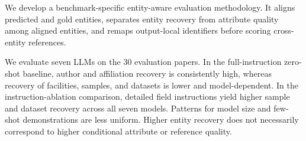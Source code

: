 We develop a benchmark-specific entity-aware evaluation methodology. It 
aligns predicted and gold entities, separates entity recovery from attribute 
quality among aligned entities, and remaps output-local identifiers before 
scoring cross-entity references.

We evaluate seven LLMs on the 30 evaluation papers. In the full-instruction 
zero-shot baseline, author and affiliation recovery is consistently high, 
whereas recovery of facilities, samples, and datasets is lower and model-dependent. 
In the instruction-ablation comparison, detailed field instructions yield higher 
sample and dataset recovery across all seven models. Patterns for model size and 
few-shot demonstrations are less uniform. Higher entity recovery does not necessarily 
correspond to higher conditional attribute or reference quality.
